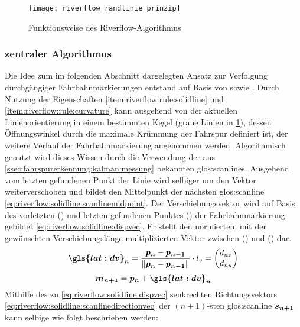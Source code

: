 \begin{figure}[H]
  \centering
  \texttt{[image: riverflow\_randlinie\_prinzip]}
  \caption{Funktionsweise des Riverflow-Algorithmus}
  \label{fig:riverflow:randlinie:prinzip}
\end{figure}

\subsubsection{zentraler Algorithmus}
Die Idee zum im folgenden Abschnitt dargelegten Ansatz zur Verfolgung durchgängiger Fahrbahnmarkierungen entstand auf Basis von \autocite{drauschkeEchtzeitfaehigeStartpunktalgorithmenFuer2016} sowie \autocite{limRiverFlowLane2012}.
Durch Nutzung der Eigenschaften \ref{item:riverflow:rule:solidline} und  \ref{item:riverflow:rule:curvature} kann ausgehend von der aktuellen Linienorientierung in einem bestimmten Kegel (graue Linien in \ref{fig:riverflow:randlinie:prinzip}), dessen Öffnungswinkel durch die maximale Krümmung der Fahrspur definiert ist, der weitere Verlauf der Fahrbahnmarkierung angenommen werden.
Algorithmisch genutzt wird dieses Wissen durch die Verwendung der aus \ref{ssec:fahrspurerkennung:kalman:messung} bekannten \glspl{glos:scanline}.
Ausgehend vom letzten gefundenen Punkt der Linie  wird selbiger um den Vektor  weiterverschoben und bildet den Mittelpunkt   der nächsten \gls{glos:scanline} \eqref{eq:riverflow:solidline:scanlinemidpoint}. Der Verschiebungsvektor  wird auf Basis des vorletzten () und letzten gefundenen Punktes () der Fahrbahnmarkierung gebildet \eqref{eq:riverflow:solidline:dispvec}. Er stellt den normierten, mit der gewünschten Verschiebungslänge  multiplizierten Vektor zwischen () und () dar.
\begin{equation}
\label{eq:riverflow:solidline:dispvec}
\vct{\gls{lat:dv}_n} =  \frac{\pnt{p_{n}} - \pnt{p_{n-1}}}{\nrm{\pnt{p_{n}} - \pnt{p_{n-1}}}} \cdot \scl{l_v}
= 
\begin{pmatrix}
\scl{d_{nx}} \\
\scl{d_{ny}}
\end{pmatrix}
\end{equation}
\begin{equation}
\label{eq:riverflow:solidline:scanlinemidpoint}
\pnt{m_{n+1}} =  \pnt{p_n} + \vct{\gls{lat:dv}_n}
\end{equation}
Mithilfe des zu  \eqref{eq:riverflow:solidline:dispvec} senkrechten Richtungsvektors  \eqref{eq:riverflow:solidline:scanlinedirectionvec} der \begin{math} (n+1)\end{math}-sten  \gls{glos:scanline} \begin{math} \boldsymbol{s_{n+1}} \end{math} kann selbige wie folgt beschrieben werden:
